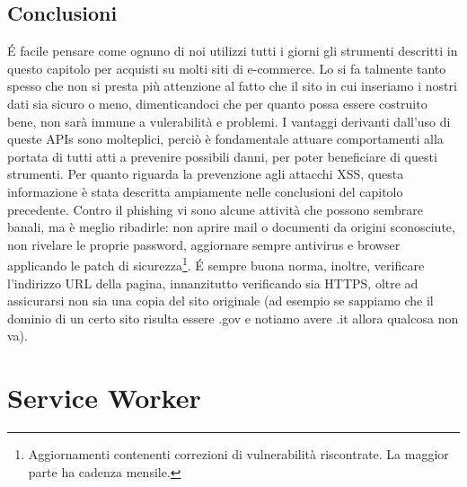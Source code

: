 \documentclass[12pt ,a4paper , twoside , openright ]{book}
\begin{document}
	\section{Conclusioni}
	\'E facile pensare come ognuno di noi utilizzi tutti i giorni gli strumenti descritti in questo capitolo per acquisti su molti siti di e-commerce. Lo si fa talmente tanto spesso che non si presta più attenzione al fatto che il sito in cui inseriamo i nostri dati sia sicuro o meno, dimenticandoci che per quanto possa essere costruito bene, non sarà immune a vulerabilità e problemi. I vantaggi derivanti dall'uso di queste APIs sono molteplici, perciò è fondamentale attuare comportamenti alla portata di tutti atti a prevenire possibili danni, per poter beneficiare di questi strumenti. Per quanto riguarda la prevenzione agli attacchi XSS, questa informazione è stata descritta ampiamente nelle conclusioni del capitolo precedente. Contro il phishing vi sono alcune attività che possono sembrare banali, ma è meglio ribadirle: non aprire mail o documenti da origini sconosciute, non rivelare le proprie password, aggiornare sempre antivirus e browser applicando le patch di sicurezza\footnote{Aggiornamenti contenenti correzioni di vulnerabilità riscontrate. La maggior parte ha cadenza mensile.}. \'E sempre buona norma, inoltre, verificare l'indirizzo URL della pagina, innanzitutto verificando sia HTTPS, oltre ad assicurarsi non sia una copia del sito originale (ad esempio se sappiamo che il dominio di un certo sito risulta essere .gov e notiamo avere .it allora qualcosa non va).  
	\chapter{Service Worker}
\end{document}
